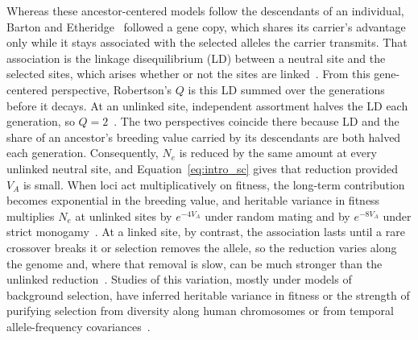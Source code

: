 \documentclass{article}
\begin{document}
Whereas these ancestor-centered models follow the descendants of an individual, Barton and Etheridge~\cite{barton2011} followed a gene copy, which shares its carrier's advantage only while it stays associated with the selected alleles the carrier transmits. That association is the linkage disequilibrium (LD) between a neutral site and the selected sites, which arises whether or not the sites are linked~\cite{barton2000}. From this gene-centered perspective, Robertson's $Q$ is this LD summed over the generations before it decays. At an unlinked site, independent assortment halves the LD each generation, so $Q = 2$~\cite{santiago1998,charlesworth2012}. The two perspectives coincide there because LD and the share of an ancestor's breeding value carried by its descendants are both halved each generation. Consequently, $N_e$ is reduced by the same amount at every unlinked neutral site, and Equation~\eqref{eq:intro_sc} gives that reduction provided $V_A$ is small. When loci act multiplicatively on fitness, the long-term contribution becomes exponential in the breeding value, and heritable variance in fitness multiplies $N_e$ at unlinked sites by $e^{-4V_A}$ under random mating and by $e^{-8V_A}$ under strict monogamy~\cite{weissman2012}. At a linked site, by contrast, the association lasts until a rare crossover breaks it or selection removes the allele, so the reduction varies along the genome and, where that removal is slow, can be much stronger than the unlinked reduction~\cite{hudson1995,nordborg1996}. Studies of this variation, mostly under models of background selection, have inferred heritable variance in fitness or the strength of purifying selection from diversity along human chromosomes or from temporal allele-frequency covariances~\cite{buffalo2019,buffalo2020,murphy2023,buffaloKern2024}.
\end{document}
